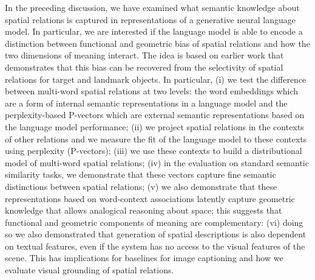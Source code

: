 In the preceding discussion, we have examined what semantic knowledge about spatial relations is captured in
representations of a generative neural language model. In particular, we are
interested if the language model is able to encode a distinction between
functional and geometric bias of spatial relations and how the two dimensions
of meaning interact. The idea is based on earlier work
that demonstrates that this bias can be recovered from the selectivity of
spatial relations for target and landmark objects.
In particular,
(i) we test the difference between multi-word spatial relations at two levels: the
word embeddings which are a form of internal semantic representations in a language model and the
perplexity-based P-vectors which are external semantic representations based on the language model performance;
(ii) we project spatial relations in the contexts of other relations and we
measure the fit of the language model to these contexts using perplexity
(P-vectors);
(iii) we use these contexts to build a distributional model of multi-word
spatial relations;
(iv) in the evaluation on standard semantic similarity tasks, we demonstrate
that these vectors capture fine semantic distinctions between spatial relations;
(v) we also demonstrate that these representations based on word-context associations latently capture geometric knowledge %
that allows analogical reasoning about space; this suggests that functional and geometric components of meaning are complementary: %
(vi) doing so we also demonstrated that generation of
spatial descriptions is also dependent on textual features, even if the system
has no access to the visual features of the scene. This has implications for
baselines for image captioning and how we evaluate visual grounding of
spatial relations.


